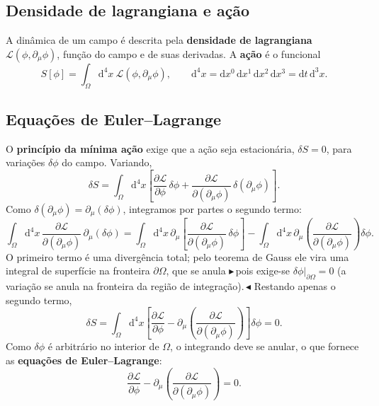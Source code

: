 \documentclass[12pt,a4paper]{article}
\newcommand{\rev}[1]{{\color{revred}\ensuremath{\blacktriangleright}\,#1\,\ensuremath{\blacktriangleleft}}}
\newcommand{\dd}{\mathrm{d}}
\newcommand{\pt}[1]{\partial_{#1}}
\newcommand{\Lag}{\mathcal{L}}
\renewcommand{\d}{\partial}
\begin{document}
\subsection{Densidade de lagrangiana e ação}

A dinâmica de um campo é descrita pela \textbf{densidade de lagrangiana}
$\Lag(\phi,\pt{\mu}\phi)$, função do campo e de suas derivadas. A
\textbf{ação} é o funcional
\begin{equation}
  S[\phi]=\int_{\Omega}\dd^{4}x\ \Lag(\phi,\pt{\mu}\phi),
  \qquad \dd^{4}x=\dd x^{0}\,\dd x^{1}\,\dd x^{2}\,\dd x^{3}
        =\dd t\,\dd^{3}x .
\end{equation}

\subsection{Equações de Euler--Lagrange}

O \textbf{princípio da mínima ação} exige que a ação seja estacionária,
$\delta S=0$, para variações $\delta\phi$ do campo. Variando,
\begin{equation}
  \delta S=\int_{\Omega}\dd^{4}x
  \left[
    \frac{\d\Lag}{\d\phi}\,\delta\phi
    +\frac{\d\Lag}{\d(\pt{\mu}\phi)}\,\delta(\pt{\mu}\phi)
  \right].
\end{equation}
Como $\delta(\pt{\mu}\phi)=\pt{\mu}(\delta\phi)$, integramos por partes o
segundo termo:
\begin{equation}
  \int_{\Omega}\dd^{4}x\,\frac{\d\Lag}{\d(\pt{\mu}\phi)}\,\pt{\mu}(\delta\phi)
  =\int_{\Omega}\dd^{4}x\,\pt{\mu}\!\!\left[\frac{\d\Lag}{\d(\pt{\mu}\phi)}\,\delta\phi\right]
  -\int_{\Omega}\dd^{4}x\,\pt{\mu}\!\!\left(\frac{\d\Lag}{\d(\pt{\mu}\phi)}\right)\delta\phi .
\end{equation}
O primeiro termo é uma divergência total; pelo teorema de Gauss ele vira
uma integral de superfície na fronteira $\d\Omega$, que se anula
\rev{pois exige-se $\delta\phi\big|_{\d\Omega}=0$ (a variação se anula na
fronteira da região de integração).}
Restando apenas o segundo termo,
\begin{equation}
  \delta S=\int_{\Omega}\dd^{4}x
  \left[\frac{\d\Lag}{\d\phi}
        -\pt{\mu}\!\left(\frac{\d\Lag}{\d(\pt{\mu}\phi)}\right)\right]\delta\phi=0 .
\end{equation}
Como $\delta\phi$ é arbitrário no interior de $\Omega$, o integrando deve
se anular, o que fornece as \textbf{equações de Euler--Lagrange}:
\begin{equation}\boxed{
  \frac{\d\Lag}{\d\phi}
  -\pt{\mu}\!\left(\frac{\d\Lag}{\d(\pt{\mu}\phi)}\right)=0 .}
\end{equation}
\end{document}
